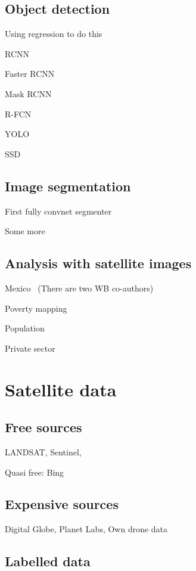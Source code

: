 \documentclass[12pt, a4paper, oneside, headinclude, footinclude]{article}
\begin{document}
\subsection{Object detection}
Using regression to do this~\cite{NIPS2013_5207}

RCNN~\cite{Girshick2014, Girshick2015}

Faster RCNN~\cite{Ren2017}

Mask RCNN~\cite{he2017}

R-FCN~\cite{NIPS2016_6465}

YOLO~\cite{redmon2016yolo}

SSD~\cite{liu2016ssd}

    
\subsection{Image segmentation}

First fully convnet segmenter~\cite{long2015fully}

Some more~\cite{chen2018, NIPS2015_5852}


\subsection{Analysis with satellite images}

Mexico~\cite{babenko2017poverty} (There are two WB co-authors)

Poverty mapping~\cite{Jean790}

Population~\cite{doupe2016, robinson2017}

Private sector~\cite{facebook, cnn_orbital}

\section{Satellite data}

\subsection{Free sources}

LANDSAT, Sentinel, 

Quasi free: Bing

\subsection{Expensive sources}

Digital Globe, Planet Labs, Own drone data

\subsection{Labelled data}
\end{document}
